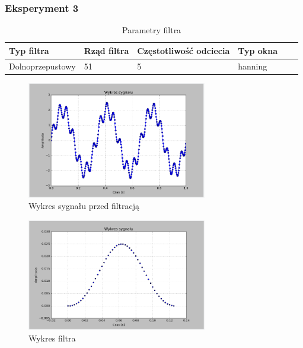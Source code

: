 \documentclass{article}
\begin{document}
{        \subsubsection{Eksperyment 3} {
            \begin{table}[h!]
            \centering
            \begin{tabular}{|l|l|l|l|l|l|}
            \hline
            Typ filtra & Rząd filtra & Częstotliwość odciecia & Typ okna  \\\hline
            Dolnoprzepustowy & 51 & 5 & hanning     \\\hline
            \end{tabular}
            \caption{Parametry filtra}
            \end{table}
            \begin{figure}[h!]
                \centering
                \includegraphics[width=0.7\textwidth]{img/sig.png}
                \caption{Wykres sygnału przed filtracją}
            \end{figure}
            \begin{figure}[h!]
                \centering
                \includegraphics[width=0.7\textwidth]{img/fil5.png}
                \caption{Wykres filtra}
            \end{figure}

}}
\end{document}
